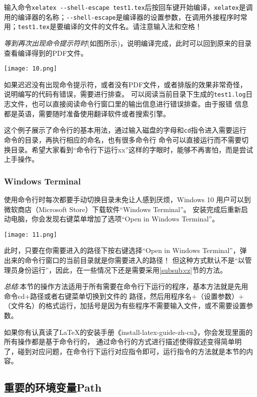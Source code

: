 输入命令\verb"xelatex --shell-escape test1.tex"后按回车键开始编译，\verb"xelatex"是调用的编译器的名称；\verb"--shell-escape"是编译器的设置参数，在调用外接程序时常用；\verb"test1.tex"是要编译的文件的文件名。请注意输入法和空格！

\emph{等到再次出现命令提示符时}(如图所示)，说明编译完成，此时可以回到原来的目录查看编译得到的PDF文件。
\begin{center}
  \texttt{[image: 10.png]}
\end{center}

如果迟迟没有出现命令提示符，或者没有PDF文件，或者排版的效果非常奇怪，说明编写的代码有错误，需要进行排查。
可以阅读当前目录下生成的\verb"test1.log"日志文件，也可以直接阅读命令行窗口里的输出信息进行错误排查。由于报错
信息都是英语，需要随时准备使用翻译软件或者搜索引擎。

这个例子展示了命令行的基本用法，通过输入磁盘的字母和\verb"cd"指令进入需要运行命令的目录，再执行相应的命名，也有很多命令行
命令可以直接运行而不需要切换目录。希望大家看到“命令行下运行xx”这样的字眼时，能够不再害怕，而是尝试上手操作。



\subsubsection{Windows Terminal}


使用命令行时每次都要手动切换目录未免让人感到厌烦，Windows 10 用户可以到微软商店（Microsoft Store）下载软件“Windows Terminal”。
安装完成后重新启动电脑，你会发现右键菜单增加了选项“Open in Windows Terminal”。

\begin{center}
  \texttt{[image: 11.png]}
\end{center}
此时，只要在你需要进入的路径下按右键选择“Open in Windows Terminal”，弹出来的命令行窗口的当前目录就是你需要进入的路径！
但这种方式默认不是“以管理员身份运行”，因此，在一些情况下还是需要采用\ref{subsub:cz}节的方法。

\emph{总结}:本节的操作方法适用于所有需要在命令行下运行的程序，基本方法就是先用命令cd+路径或者右键菜单切换到文件的
路径，然后用程序名+（设置参数）+（文件名）的格式运行，加括号是因为有些程序不需要输入文件，或不需要设置参数。

如果你有认真读了\LaTeX{}的安装手册《install-latex-guide-zh-cn》，你会发现里面的所有操作都是基于命令行的，
通过命令行的方式进行描述使得叙述变得简单明了，碰到对应问题，在命令行下运行对应指令即可，运行指令的方法就是本节的内容。
\subsection{重要的环境变量Path}


